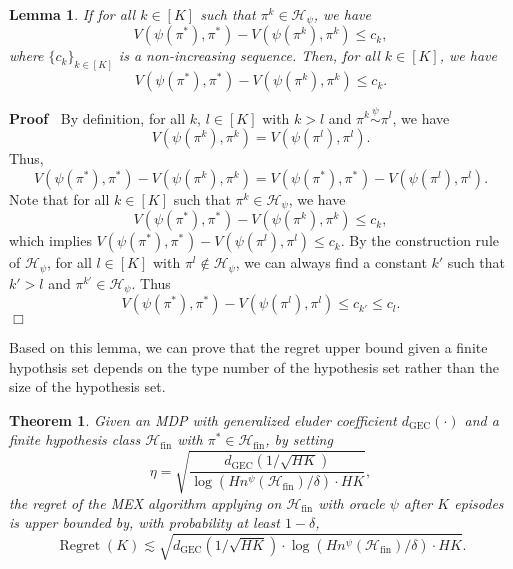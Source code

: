 \documentclass{article}
\newcommand{\nin}{\not\in}
\newcommand{\tmop}[1]{\ensuremath{\operatorname{#1}}}
\newenvironment{proof}{\noindent\textbf{Proof\ }}{\hspace*{\fill}$\Box$\medskip}
\newtheorem{lemma}{Lemma}
\newtheorem{theorem}{Theorem}
\begin{document}
\begin{lemma}
  \label{lem:increasing-seq}If for all $k \in [K]$ such that $\pi^k \in
  \mathcal{H}_{\psi}$, we have
  \[ V \left( \psi (\pi^{\ast}) {, \pi^{\ast}}^{} \right) - V (\psi (\pi^k),
     \pi^k) \leq c_k, \]
  where $\{ c_k \}_{k \in [K]}$ is a non-increasing sequence. Then, for all $k
  \in [K]$, we have
  \[ V \left( \psi (\pi^{\ast}) {, \pi^{\ast}}^{} \right) - V (\psi (\pi^k),
     \pi^k) \leq c_k . \]
\end{lemma}

\begin{proof}
  By definition, for all $k$, $l \in [K]$ with $k > l$ and $\pi^k
  \overset{\psi}{\sim} \pi^l$, we have
  \[ V (\psi (\pi^k), \pi^k) = V (\psi (\pi^l), \pi^l) . \]
  Thus,
  \[ V \left( \psi (\pi^{\ast}) {, \pi^{\ast}}^{} \right) - V (\psi (\pi^k),
     \pi^k) = V \left( \psi (\pi^{\ast}) {, \pi^{\ast}}^{} \right) - V (\psi
     (\pi^l), \pi^l) . \]
  Note that for all $k \in [K]$ such that $\pi^k \in \mathcal{H}_{\psi}$, we
  have
  \[ V \left( \psi (\pi^{\ast}) {, \pi^{\ast}}^{} \right) - V (\psi (\pi^k),
     \pi^k) \leq c_k, \]
  which implies $V \left( \psi (\pi^{\ast}) {, \pi^{\ast}}^{} \right) - V
  (\psi (\pi^l), \pi^l) \leq c_k$. By the construction rule of
  $\mathcal{H}_{\psi}$, for all $l \in [K]$ with $\pi^l \nin
  \mathcal{H}_{\psi}$, we can always find a constant $k'$ such that $k' > l$
  and $\pi^{k'} \in \mathcal{H}_{\psi}$. Thus
  \[ V (\psi (\pi^{\ast}), \pi^{\ast}) - V (\psi (\pi^l), \pi^l) \leq c_{k'}
     \leq c_l . \]
\end{proof}

Based on this lemma, we can prove that the regret upper bound given a finite
hypothsis set depends on the type number of the hypothesis set rather than the
size of the hypothesis set.

\begin{theorem}
  \label{thm:fin}Given an MDP with generalized eluder coefficient
  $d_{\tmop{GEC}} (\cdot)$ and a finite hypothesis class
  $\mathcal{H}_{\tmop{fin}} $ with $\pi^{\ast} \in \mathcal{H}_{\tmop{fin}}$,
  by setting
  \[ \eta = \sqrt{\frac{d_{\tmop{GEC}} \left( 1 / \sqrt{H K} \right)}{\log (H
     n^{\psi} (\mathcal{H}_{\tmop{fin}}) / \delta) \cdot H K}}, \]
  the regret of the MEX algorithm applying on $\mathcal{H}_{\tmop{fin}}$ with
  oracle $\psi$ after $K$ episodes is upper bounded by, with probability at
  least $1 - \delta$,
  \[ \tmop{Regret} (K) \lesssim \sqrt{d_{\tmop{GEC}} \left( 1 / \sqrt{H K}
     \right) \cdot \log (H n^{\psi} (\mathcal{H}_{\tmop{fin}}) / \delta) \cdot
     H K} . \]
\end{theorem}
\end{document}
